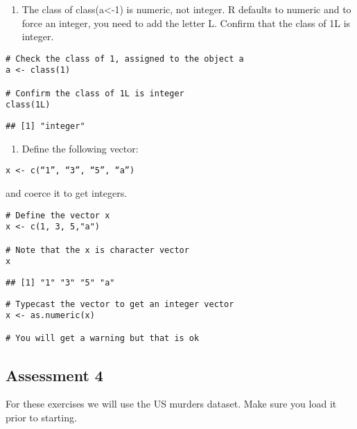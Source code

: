 \documentclass[
]{article}
\providecommand{\tightlist}{%
  \setlength{\itemsep}{0pt}\setlength{\parskip}{0pt}}
\begin{document}
\begin{enumerate}
\def\labelenumi{\arabic{enumi}.}
\setcounter{enumi}{10}
\tightlist
\item
  The class of class(a\textless-1) is numeric, not integer. R defaults
  to numeric and to force an integer, you need to add the letter L.
  Confirm that the class of 1L is integer.
\end{enumerate}

\begin{verbatim}
# Check the class of 1, assigned to the object a
a <- class(1)

# Confirm the class of 1L is integer
class(1L)
\end{verbatim}

\begin{verbatim}
## [1] "integer"
\end{verbatim}

\begin{enumerate}
\def\labelenumi{\arabic{enumi}.}
\setcounter{enumi}{11}
\tightlist
\item
  Define the following vector:
\end{enumerate}

\begin{verbatim}
x <- c(“1”, “3”, “5”, “a”)
\end{verbatim}

and coerce it to get integers.

\begin{verbatim}
# Define the vector x
x <- c(1, 3, 5,"a")

# Note that the x is character vector
x
\end{verbatim}

\begin{verbatim}
## [1] "1" "3" "5" "a"
\end{verbatim}

\begin{verbatim}
# Typecast the vector to get an integer vector
x <- as.numeric(x)

# You will get a warning but that is ok
\end{verbatim}

\hypertarget{assessment-4}{%
\subsection{Assessment 4}\label{assessment-4}}

For these exercises we will use the US murders dataset. Make sure you
load it prior to starting.
\end{document}
